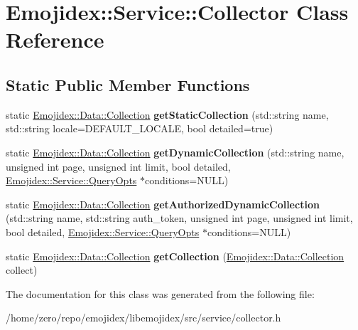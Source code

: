 \hypertarget{classEmojidex_1_1Service_1_1Collector}{}\section{Emojidex\+:\+:Service\+:\+:Collector Class Reference}
\label{classEmojidex_1_1Service_1_1Collector}
\subsection*{Static Public Member Functions}
\begin{DoxyCompactItemize}
\item 
static \hyperlink{classEmojidex_1_1Data_1_1Collection}{Emojidex\+::\+Data\+::\+Collection} {\bfseries get\+Static\+Collection} (std\+::string name, std\+::string locale=D\+E\+F\+A\+U\+L\+T\+\_\+\+L\+O\+C\+A\+LE, bool detailed=true)\hypertarget{classEmojidex_1_1Service_1_1Collector_a51ed2454051cff8ee1b76dfe0ebd0e3c}{}\label{classEmojidex_1_1Service_1_1Collector_a51ed2454051cff8ee1b76dfe0ebd0e3c}

\item 
static \hyperlink{classEmojidex_1_1Data_1_1Collection}{Emojidex\+::\+Data\+::\+Collection} {\bfseries get\+Dynamic\+Collection} (std\+::string name, unsigned int page, unsigned int limit, bool detailed, \hyperlink{classEmojidex_1_1Service_1_1QueryOpts}{Emojidex\+::\+Service\+::\+Query\+Opts} $\ast$conditions=N\+U\+LL)\hypertarget{classEmojidex_1_1Service_1_1Collector_a3d576269475065aef15391dd597dfd5a}{}\label{classEmojidex_1_1Service_1_1Collector_a3d576269475065aef15391dd597dfd5a}

\item 
static \hyperlink{classEmojidex_1_1Data_1_1Collection}{Emojidex\+::\+Data\+::\+Collection} {\bfseries get\+Authorized\+Dynamic\+Collection} (std\+::string name, std\+::string auth\+\_\+token, unsigned int page, unsigned int limit, bool detailed, \hyperlink{classEmojidex_1_1Service_1_1QueryOpts}{Emojidex\+::\+Service\+::\+Query\+Opts} $\ast$conditions=N\+U\+LL)\hypertarget{classEmojidex_1_1Service_1_1Collector_a4d3839fcce3e4191b3076c64bab9a925}{}\label{classEmojidex_1_1Service_1_1Collector_a4d3839fcce3e4191b3076c64bab9a925}

\item 
static \hyperlink{classEmojidex_1_1Data_1_1Collection}{Emojidex\+::\+Data\+::\+Collection} {\bfseries get\+Collection} (\hyperlink{classEmojidex_1_1Data_1_1Collection}{Emojidex\+::\+Data\+::\+Collection} collect)\hypertarget{classEmojidex_1_1Service_1_1Collector_afeb2efb1c30de239a89f360eba795818}{}\label{classEmojidex_1_1Service_1_1Collector_afeb2efb1c30de239a89f360eba795818}

\end{DoxyCompactItemize}


The documentation for this class was generated from the following file\+:\begin{DoxyCompactItemize}
\item 
/home/zero/repo/emojidex/libemojidex/src/service/collector.\+h\end{DoxyCompactItemize}
